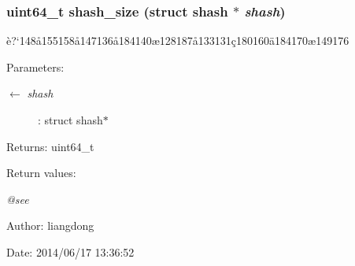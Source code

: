 \subsubsection{\setlength{\rightskip}{0pt plus 5cm}uint64\_\-t shash\_\-size (struct shash $\ast$ {\em shash})}\label{shash_8c_a14}


\`{e}?`148\aa{}155158\aa{}147136\aa{}184140\ae{}128187\aa{}133131\c{c}180160\"{a}184170\ae{}149176 

\begin{Desc}
\item[Parameters:]
\begin{description}
\item[\mbox{$\leftarrow$} {\em shash}]: struct shash$\ast$ \end{description}
\end{Desc}
\begin{Desc}
\item[Returns:]uint64\_\-t \end{Desc}
\begin{Desc}
\item[Return values:]
\begin{description}
\item[{\em @see}]\end{description}
\end{Desc}
\begin{Desc}
\item[Author:]liangdong \end{Desc}
\begin{Desc}
\item[Date:]2014/06/17 13:36:52 \end{Desc}
